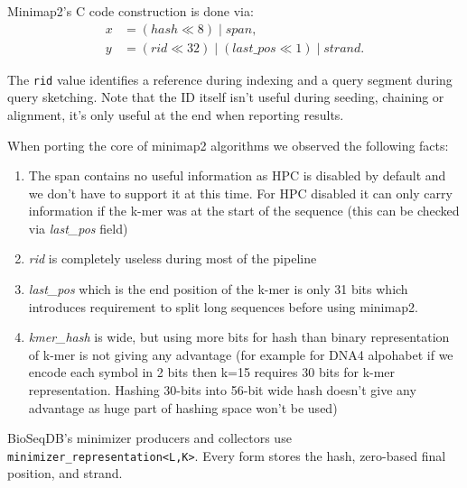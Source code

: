 Minimap2's C code construction is done via:
\begin{align}
  x&=(\mathit{hash}\ll 8)\mathbin{|}\mathit{span},\\
  y&=(\mathit{rid}\ll 32)\mathbin{|}
     (\mathit{last\_pos}\ll 1)\mathbin{|}\mathit{strand}.
\end{align}

\label{info:minimap-hpc}


The \texttt{rid} value identifies a reference during indexing and a query segment during query sketching. Note that the ID itself isn't useful during seeding, chaining or alignment, it's only useful at the end when reporting results.

When porting the core of minimap2 algorithms we observed the following facts:
\begin{enumerate}
  \item The span contains no useful information as HPC is disabled by default and we don't have to support it at this time. For HPC disabled it can only carry information if the k-mer was at the start of the sequence (this can be checked via \emph{last\_pos} field)
  \item \emph{rid} is completely useless during most of the pipeline
  \item \emph{last\_pos} which is the end position of the k-mer is only 31 bits which introduces requirement to split long sequences before using minimap2.
  \item \emph{kmer\_hash} is wide, but using more bits for hash than binary representation of k-mer is not giving any advantage (for example for DNA4 alpohabet if we encode each symbol in 2 bits then k=15 requires 30 bits for k-mer representation. Hashing 30-bits into 56-bit wide hash doesn't give any advantage as huge part of hashing space won't be used)
\end{enumerate}

BioSeqDB's minimizer producers and collectors use \texttt{minimizer\_representation<L,K>}.
Every form stores the hash, zero-based final position, and strand.

